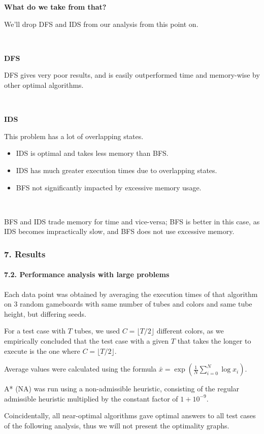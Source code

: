 \documentclass{beamer}
\begin{document}
\begin{frame}%

  {\Large \textbf{What do we take from that?}}

  We'll drop DFS and IDS from our analysis from this point on.

  ~

  \textbf{DFS}

  DFS gives very poor results, and is easily outperformed time and memory-wise by other optimal algorithms.

  ~

  \textbf{IDS}

  This problem has a lot of overlapping states.
  \begin{itemize}
    \item IDS is optimal and takes less memory than BFS.
    \item IDS has much greater execution times due to overlapping states.
    \item BFS not significantly impacted by excessive memory usage.
  \end{itemize}

  ~

  BFS and IDS trade memory for time and vice-versa; BFS is better in this case, as IDS becomes impractically slow, and BFS does not use excessive memory.
\end{frame}

\begin{frame}
  \frametitle{7. Results}
  \framesubtitle{7.2. Performance analysis with large problems}

  Each data point was obtained by averaging the execution times of that algorithm on 3 random gameboards with same number of tubes and colors and same tube height, but differing seeds.

  For a test case with $T$ tubes, we used $C = \lfloor T/2 \rfloor$ different colors, as we empirically concluded that the test case with a given $T$ that takes the longer to execute is the one where $C = \lfloor T/2 \rfloor$.

  Average values were calculated using the formula $\bar{x} = \exp{\left(\frac{1}{N}\sum_{i=0}^{N}\log{x_i}\right)}$.

  A* (NA) was run using a non-admissible heuristic, consisting of the regular admissible heuristic multiplied by the constant factor of $1+10^{-9}$.

  Coincidentally, all near-optimal algorithms gave optimal answers to all test cases of the following analysis, thus we will not present the optimality graphs.

\end{frame}
\end{document}
